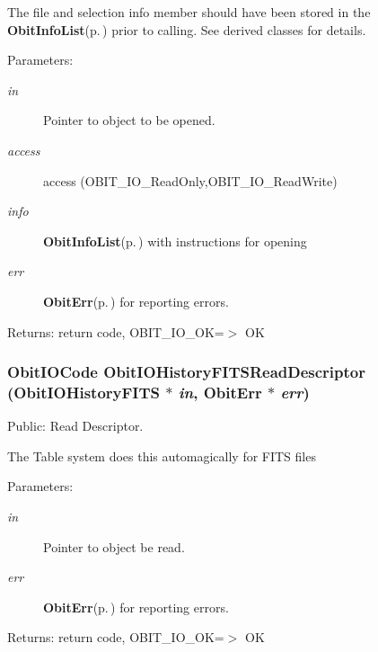 The file and selection info member should have been stored in the {\bf Obit\-Info\-List}{\rm (p.\,\pageref{structObitInfoList})} prior to calling. See derived classes for details. \begin{Desc}
\item[Parameters:]
\begin{description}
\item[{\em in}]Pointer to object to be opened. \item[{\em access}]access (OBIT\_\-IO\_\-Read\-Only,OBIT\_\-IO\_\-Read\-Write) \item[{\em info}]{\bf Obit\-Info\-List}{\rm (p.\,\pageref{structObitInfoList})} with instructions for opening \item[{\em err}]{\bf Obit\-Err}{\rm (p.\,\pageref{structObitErr})} for reporting errors. \end{description}
\end{Desc}
\begin{Desc}
\item[Returns:]return code, OBIT\_\-IO\_\-OK=$>$ OK \end{Desc}
\subsubsection{\setlength{\rightskip}{0pt plus 5cm}Obit\-IOCode Obit\-IOHistory\-FITSRead\-Descriptor ({\bf Obit\-IOHistory\-FITS} $\ast$ {\em in}, {\bf Obit\-Err} $\ast$ {\em err})}\label{ObitIOHistoryFITS_8c_a18}


Public: Read Descriptor. 

The Table system does this automagically for FITS files \begin{Desc}
\item[Parameters:]
\begin{description}
\item[{\em in}]Pointer to object be read. \item[{\em err}]{\bf Obit\-Err}{\rm (p.\,\pageref{structObitErr})} for reporting errors. \end{description}
\end{Desc}
\begin{Desc}
\item[Returns:]return code, OBIT\_\-IO\_\-OK=$>$ OK \end{Desc}
